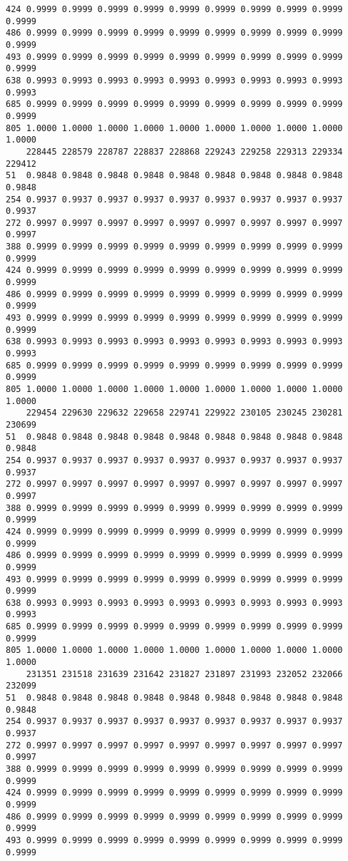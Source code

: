 \documentclass[
]{report}
\begin{document}
\begin{verbatim}
424 0.9999 0.9999 0.9999 0.9999 0.9999 0.9999 0.9999 0.9999 0.9999 0.9999
486 0.9999 0.9999 0.9999 0.9999 0.9999 0.9999 0.9999 0.9999 0.9999 0.9999
493 0.9999 0.9999 0.9999 0.9999 0.9999 0.9999 0.9999 0.9999 0.9999 0.9999
638 0.9993 0.9993 0.9993 0.9993 0.9993 0.9993 0.9993 0.9993 0.9993 0.9993
685 0.9999 0.9999 0.9999 0.9999 0.9999 0.9999 0.9999 0.9999 0.9999 0.9999
805 1.0000 1.0000 1.0000 1.0000 1.0000 1.0000 1.0000 1.0000 1.0000 1.0000
    228445 228579 228787 228837 228868 229243 229258 229313 229334 229412
51  0.9848 0.9848 0.9848 0.9848 0.9848 0.9848 0.9848 0.9848 0.9848 0.9848
254 0.9937 0.9937 0.9937 0.9937 0.9937 0.9937 0.9937 0.9937 0.9937 0.9937
272 0.9997 0.9997 0.9997 0.9997 0.9997 0.9997 0.9997 0.9997 0.9997 0.9997
388 0.9999 0.9999 0.9999 0.9999 0.9999 0.9999 0.9999 0.9999 0.9999 0.9999
424 0.9999 0.9999 0.9999 0.9999 0.9999 0.9999 0.9999 0.9999 0.9999 0.9999
486 0.9999 0.9999 0.9999 0.9999 0.9999 0.9999 0.9999 0.9999 0.9999 0.9999
493 0.9999 0.9999 0.9999 0.9999 0.9999 0.9999 0.9999 0.9999 0.9999 0.9999
638 0.9993 0.9993 0.9993 0.9993 0.9993 0.9993 0.9993 0.9993 0.9993 0.9993
685 0.9999 0.9999 0.9999 0.9999 0.9999 0.9999 0.9999 0.9999 0.9999 0.9999
805 1.0000 1.0000 1.0000 1.0000 1.0000 1.0000 1.0000 1.0000 1.0000 1.0000
    229454 229630 229632 229658 229741 229922 230105 230245 230281 230699
51  0.9848 0.9848 0.9848 0.9848 0.9848 0.9848 0.9848 0.9848 0.9848 0.9848
254 0.9937 0.9937 0.9937 0.9937 0.9937 0.9937 0.9937 0.9937 0.9937 0.9937
272 0.9997 0.9997 0.9997 0.9997 0.9997 0.9997 0.9997 0.9997 0.9997 0.9997
388 0.9999 0.9999 0.9999 0.9999 0.9999 0.9999 0.9999 0.9999 0.9999 0.9999
424 0.9999 0.9999 0.9999 0.9999 0.9999 0.9999 0.9999 0.9999 0.9999 0.9999
486 0.9999 0.9999 0.9999 0.9999 0.9999 0.9999 0.9999 0.9999 0.9999 0.9999
493 0.9999 0.9999 0.9999 0.9999 0.9999 0.9999 0.9999 0.9999 0.9999 0.9999
638 0.9993 0.9993 0.9993 0.9993 0.9993 0.9993 0.9993 0.9993 0.9993 0.9993
685 0.9999 0.9999 0.9999 0.9999 0.9999 0.9999 0.9999 0.9999 0.9999 0.9999
805 1.0000 1.0000 1.0000 1.0000 1.0000 1.0000 1.0000 1.0000 1.0000 1.0000
    231351 231518 231639 231642 231827 231897 231993 232052 232066 232099
51  0.9848 0.9848 0.9848 0.9848 0.9848 0.9848 0.9848 0.9848 0.9848 0.9848
254 0.9937 0.9937 0.9937 0.9937 0.9937 0.9937 0.9937 0.9937 0.9937 0.9937
272 0.9997 0.9997 0.9997 0.9997 0.9997 0.9997 0.9997 0.9997 0.9997 0.9997
388 0.9999 0.9999 0.9999 0.9999 0.9999 0.9999 0.9999 0.9999 0.9999 0.9999
424 0.9999 0.9999 0.9999 0.9999 0.9999 0.9999 0.9999 0.9999 0.9999 0.9999
486 0.9999 0.9999 0.9999 0.9999 0.9999 0.9999 0.9999 0.9999 0.9999 0.9999
493 0.9999 0.9999 0.9999 0.9999 0.9999 0.9999 0.9999 0.9999 0.9999 0.9999

\end{verbatim}
\end{document}
